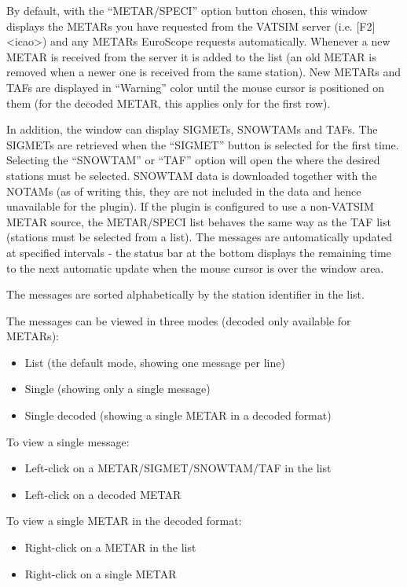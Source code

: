 \documentclass[11pt,a4paper,oldfontcommands]{memoir}
\begin{document}
By default, with the “METAR/SPECI” option button chosen, this window displays the METARs you have requested from the VATSIM server (i.e. [F2] <icao>) and any METARs EuroScope requests automatically. Whenever a new METAR is received from the server it is added to the list (an old METAR is removed when a newer one is received from the same station). New METARs and TAFs are displayed in “Warning” color until the mouse cursor is positioned on them (for the decoded METAR, this applies only for the first row).

In addition, the window can display SIGMETs, SNOWTAMs and TAFs. The SIGMETs are retrieved when the “SIGMET” button is selected for the first time. Selecting the “SNOWTAM” or “TAF” option will open the \textit{} where the desired stations must be selected. SNOWTAM data is downloaded together with the NOTAMs (as of writing this, they are not included in the data and hence unavailable for the plugin). If the plugin is configured to use a non-VATSIM METAR source, the METAR/SPECI list behaves the same way as the TAF list (stations must be selected from a list). The messages are automatically updated at specified intervals - the status bar at the bottom displays the remaining time to the next automatic update when the mouse cursor is over the window area.

The messages are sorted alphabetically by the station identifier in the list.

The messages can be viewed in three modes (decoded only available for METARs):

\begin{itemize}
    \item List (the default mode, showing one message per line)
    \item Single (showing only a single message)
    \item Single decoded (showing a single METAR in a decoded format)
\end{itemize}

To view a single message:

\begin{itemize}
    \item Left-click on a METAR/SIGMET/SNOWTAM/TAF in the list
    \item Left-click on a decoded METAR
\end{itemize}

To view a single METAR in the decoded format:

\begin{itemize}
    \item Right-click on a METAR in the list
    \item Right-click on a single METAR
\end{itemize}
\end{document}
